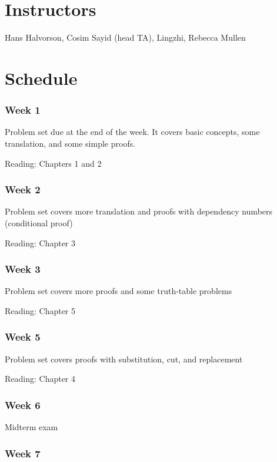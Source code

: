 \documentclass[12pt]{article}
\begin{document}
\section{Instructors}

Hans Halvorson, Cosim Sayid (head TA), Lingzhi, Rebecca Mullen



\section{Schedule}

\subsubsection*{Week 1}

Problem set due at the end of the week. It covers basic concepts, some
translation, and some simple proofs.

Reading: Chapters 1 and 2

\subsubsection*{Week 2}

Problem set covers more translation and proofs with dependency numbers
(conditional proof)

Reading: Chapter 3

\subsubsection*{Week 3}

Problem set covers more proofs and some truth-table problems

Reading: Chapter 5

\subsubsection*{Week 5}

Problem set covers proofs with substitution, cut, and replacement

Reading: Chapter 4

\subsubsection*{Week 6}

Midterm exam


\subsubsection*{Week 7}
\end{document}
